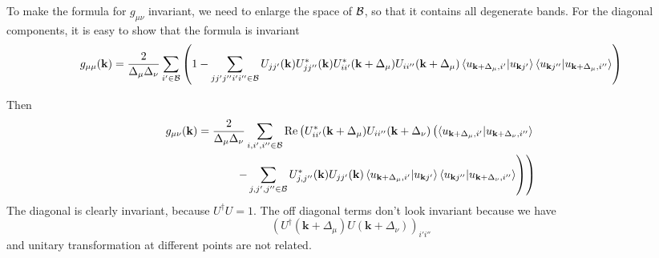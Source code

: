 \documentclass[onecolumn, prb,preprintnumbers,amsmath,amssymb,floatfix]{revtex4}
\newcommand{\vk}{{\mathbf{k}}}
\newcommand{\cb}{{\cal B}}
\begin{document}
To make the formula for $g_{\mu\nu}$ invariant, we need to enlarge the space of $\cb$, so that it contains all degenerate bands.
For the diagonal components, it is easy to show that the formula is invariant
\begin{eqnarray}
g_{\mu\mu}(\vk)  =
  \frac{2}{\Delta_\mu\Delta_\nu}\sum_{i' \in \cb}
  \left(1  -\sum_{jj'j''i'i''\in\cb}
  U_{jj'}(\vk)U^*_{jj''}(\vk) U_{i i'}^*(\vk+\Delta_{\mu})U_{i i''}(\vk+\Delta_\mu)
  \braket{ u_{\vk+\Delta_\mu,i'}|u_{\vk j'}}\braket{u_{\vk j''}| u_{\vk+\Delta_\mu,i''}}\right)
\end{eqnarray}


Then 
\begin{eqnarray}
g_{\mu\nu}(\vk)  =
  \frac{2}{\Delta_\mu\Delta_\nu}\sum_{i,i',i''\in \cb}\textrm{Re}
  \left(U^*_{i i'}(\vk+\Delta_\mu)U_{i i''}(\vk+\Delta_\nu)
  \left(\braket{u_{\vk+\Delta_\mu,i'}|u_{\vk+\Delta_\nu,i''}}
  \right.\right.
\\  
  \left.\left.
  -\sum_{j,j',j''\in\cb}
  U^*_{j,j''}(\vk)U_{jj'}(\vk)\braket{ u_{\vk+\Delta_\mu,i'}|u_{\vk j'}}\braket{u_{\vk j''}| u_{\vk+\Delta_\nu,i''}}
  \right)\right)
\end{eqnarray}
The diagonal is clearly invariant, because $U^\dagger U=1$. The off diagonal terms don't look invariant because we have
$$(U^\dagger(\vk+\Delta_\mu)U(\vk+\Delta_\nu))_{i'i''}$$ and unitary transformation at different points are not related.
\end{document}
